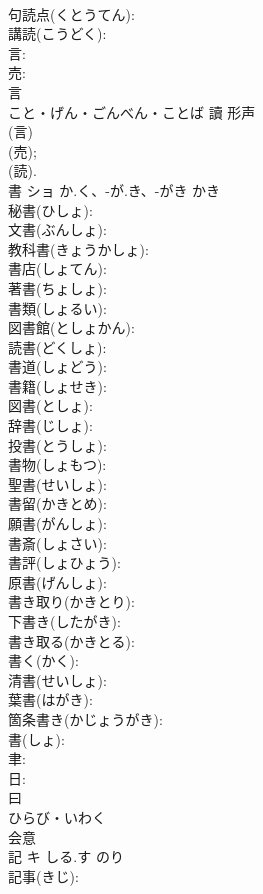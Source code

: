 \documentclass[8pt]{extreport}
\begin{document}
\begin{CJK}{UTF8}{min}
\\	句読点(くとうてん): 
\\	講読(こうどく): 
\\	言: 
\\	売: 
\\	言	
\\	こと・げん・ごんべん・ことば	讀	形声 
\\	(言) 
\\	(売); 
\\	(読).
\\	書	ショ	か.く、-が.き、-がき	かき	
\\	秘書(ひしょ): 
\\	文書(ぶんしょ): 
\\	教科書(きょうかしょ): 
\\	書店(しょてん): 
\\	著書(ちょしょ): 
\\	書類(しょるい): 
\\	図書館(としょかん): 
\\	読書(どくしょ): 
\\	書道(しょどう): 
\\	書籍(しょせき): 
\\	図書(としょ): 
\\	辞書(じしょ): 
\\	投書(とうしょ): 
\\	書物(しょもつ): 
\\	聖書(せいしょ): 
\\	書留(かきとめ): 
\\	願書(がんしょ): 
\\	書斎(しょさい): 
\\	書評(しょひょう): 
\\	原書(げんしょ): 
\\	書き取り(かきとり): 
\\	下書き(したがき): 
\\	書き取る(かきとる): 
\\	書く(かく): 
\\	清書(せいしょ): 
\\	葉書(はがき): 
\\	箇条書き(かじょうがき): 
\\	書(しょ): 
\\	聿: 
\\	日: 
\\	曰	
\\	ひらび・いわく	
\\	会意 
\\	記	キ	しる.す	のり	
\\	記事(きじ): 

\end{CJK}
\end{document}
